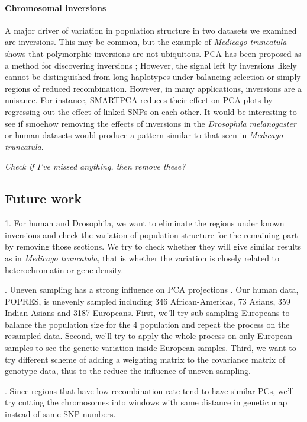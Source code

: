 \documentclass[11pt, oneside]{article}   	%
\newcommand{\plr}[1]{{\em \color{blue} #1}}
\begin{document}
\paragraph{Chromosomal inversions}
A major driver of variation in population structure in two datasets we examined are inversions.
This may be common,
but the example of \textit{Medicago truncatula} shows that polymorphic inversions are not ubiquitous.
PCA has been proposed as a method for discovering inversions \citep{ma2012investigation};
However, the signal left by inversions likely cannot be distinguished from long haplotypes under balancing selection 
or simply regions of reduced recombination.
However, in many applications, inversions are a nuisance.
For instance, SMARTPCA \citep{patterson2006population} reduces their effect on PCA plots
by regressing out the effect of linked SNPs on each other.
It would be interesting to see if smoehow removing the effects of inversions in the \textit{Drosophila melanogaster} or human datasets
would produce a pattern similar to that seen in \textit{Medicago truncatula}.

\plr{Check if I've missed anything, then remove these?}

\subsection{Future work}
1. For human and Drosophila, we want to eliminate the regions under known inversions and check the variation of population structure for the remaining part by removing those sections. We try to check whether they will give similar results as in \textit{Medicago truncatula}, that is whether the variation is closely related to heterochromatin or gene density.

. Uneven sampling has a strong influence on PCA projections \citep{mcvean2009genealogical}. 
Our human data, POPRES, is unevenly sampled including 346 African-Americas, 73 Asians, 359 Indian Asians and 3187 Europeans. 
First, we'll try sub-sampling Europeans to balance the population size for the 4 population and repeat the process on the resampled data. 
Second, we'll try to apply the whole process on only European samples to see the genetic variation inside European samples. 
Third, we want to try different scheme of adding a weighting matrix to the covariance matrix of genotype data, thus to the reduce the influence of uneven sampling.

. Since regions that have low recombination rate tend to have similar PCs, we'll try cutting the chromosomes into windows with same distance in genetic map instead of same SNP numbers.
\end{document}

